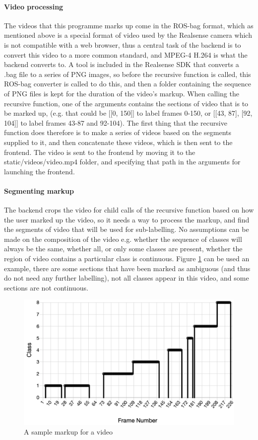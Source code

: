     \paragraph{Video processing}
    The videos that this programme marks up come in the ROS-bag format, which as mentioned above is a special format of video used by the Realsense camera which is not compatible with a web browser, thus a central task of the backend is to convert this video to a more common standard, and MPEG-4 H.264 is what the backend converts to. A tool is included in the Realsense SDK that converts a .bag file to a series of PNG images, so before the recursive function is called, this ROS-bag converter is called to do this, and then a folder containing the sequence of PNG files is kept for the duration of the video's markup. When calling the recursive function, one of the arguments contains the sections of video that is to be marked up, (e.g. that could be [[0, 150]] to label frames 0-150, or [[43, 87], [92, 104]] to label frames 43-87 and 92-104). The first thing that the recursive function does therefore is to make a series of videos based on the segments supplied to it, and then concatenate these videos, which is then sent to the frontend. The video is sent to the frontend by moving it to the static/videos/video.mp4 folder, and specifying that path in the arguments for launching the frontend.

    \paragraph{Segmenting markup}
    The backend crops the video for child calls of the recursive function based on how the user marked up the video, so it needs a way to process the markup, and find the segments of video that will be used for sub-labelling. No assumptions can be made on the composition of the video e.g. whether the sequence of classes will always be the same, whether all, or only some classes are present, whether the region of video contains a particular class is continuous. Figure \ref{fig:labelsample} can be used an example, there are some sections that have been marked as ambiguous (and thus do not need any further labelling), not all classes appear in this video, and some sections are not continuous.

    \begin{figure}[h]
        \centering
        \includegraphics[width=450px]{../img/sample_label.png}
        \caption{A sample markup for a video}
        \label{fig:labelsample}
    \end{figure}

